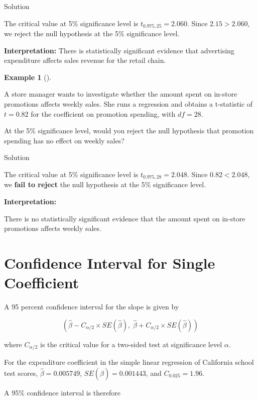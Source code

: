 \documentclass[
  12pt,
  letterpaper,
]{scrbook}
\theoremstyle{plain}
\theoremstyle{definition}
\newtheorem{example}{Example}[chapter]
\theoremstyle{remark}
\begin{document}
Solution

\label{solution2}
The critical value at 5\% significance level is \(t_{0.975,25}=2.060\).
Since \(2.15 > 2.060\), we reject the null hypothesis at the 5\%
significance level.

\textbf{Interpretation:} There is statistically significant evidence
that advertising expenditure affects sales revenue for the retail chain.

\begin{example}[]\protect\hypertarget{exm-3}{}\label{exm-3}

A store manager wants to investigate whether the amount spent on
in-store promotions affects weekly sales. She runs a regression and
obtains a t-statistic of \(t = 0.82\) for the coefficient on promotion
spending, with \(df = 28\).

At the 5\% significance level, would you reject the null hypothesis that
promotion spending has no effect on weekly sales?

\end{example}

Solution

\label{solution3}
The critical value at 5\% significance level is \(t_{0.975,28}=2.048\).
Since \(0.82 < 2.048\), we \textbf{fail to reject} the null hypothesis
at the 5\% significance level.

\textbf{Interpretation:}

There is no statistically significant evidence that the amount spent on
in-store promotions affects weekly sales.

\section{Confidence Interval for Single
Coefficient}\label{confidence-interval-for-single-coefficient}

A 95 percent confidence interval for the slope is given by

\[
\left(\hat{\beta}-C_{\alpha/2}\times SE(\hat{\beta}),\; \hat{\beta}+C_{\alpha/2}\times SE(\hat{\beta})\right)
\]

where \(C_{\alpha/2}\) is the critical value for a two-sided test at
significance level \(\alpha\).

For the expenditure coefficient in the simple linear regression of
California school test scores, \(\hat{\beta}=0.005749\),
\(SE(\hat{\beta})=0.001443\), and \(C_{0.025}=1.96\).

A 95\% confidence interval is therefore
\end{document}
